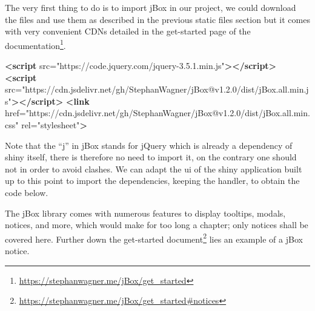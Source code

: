\documentclass[
]{krantz}
\makeatletter
\newenvironment{Shaded}{\begin{snugshade}}{\end{snugshade}}
\newcommand{\DataTypeTok}[1]{\textcolor[rgb]{0.27,0.27,0.27}{#1}}
\newcommand{\KeywordTok}[1]{\textcolor[rgb]{0.27,0.27,0.27}{\textbf{#1}}}
\newcommand{\NormalTok}[1]{#1}
\newcommand{\OperatorTok}[1]{\textcolor[rgb]{0.43,0.43,0.43}{\textbf{#1}}}
\newcommand{\OtherTok}[1]{\textcolor[rgb]{0.37,0.37,0.37}{#1}}
\newcommand{\StringTok}[1]{\textcolor[rgb]{0.5,0.5,0.5}{#1}}
\renewcommand{\href}[2]{#2\footnote{\url{#1}}}
\newenvironment{kframe}{%
\medskip{}
\setlength{\fboxsep}{.8em}
 \def\at@end@of@kframe{}%
 \ifinner\ifhmode%
  \def\at@end@of@kframe{\end{minipage}}%
  \begin{minipage}{\columnwidth}%
 \fi\fi%
 \def\FrameCommand##1{\hskip\@totalleftmargin \hskip-\fboxsep
 \colorbox{shadecolor}{##1}\hskip-\fboxsep
     \hskip-\linewidth \hskip-\@totalleftmargin \hskip\columnwidth}%
 \MakeFramed {\advance\hsize-\width
   \@totalleftmargin\z@ \linewidth\hsize
   \@setminipage}}%
 {\par\unskip\endMakeFramed%
 \at@end@of@kframe}
\renewenvironment{Shaded}{\begin{kframe}}{\end{kframe}}
\makeatother
\begin{document}
The very first thing to do is to import jBox in our project, we could download the files and use them as described in the previous static files section but it comes with very convenient CDNs detailed in the \href{https://stephanwagner.me/jBox/get_started}{get-started page of the documentation}.

\begin{Shaded}
\begin{Highlighting}[]
\KeywordTok{<script}\OtherTok{ src=}\StringTok{"https://code.jquery.com/jquery{-}3.5.1.min.js"}\KeywordTok{></script>}
\KeywordTok{<script}\OtherTok{ src=}\StringTok{"https://cdn.jsdelivr.net/gh/StephanWagner/jBox@v1.2.0/dist/jBox.all.min.js"}\KeywordTok{></script>}
\KeywordTok{<link}\OtherTok{ href=}\StringTok{"https://cdn.jsdelivr.net/gh/StephanWagner/jBox@v1.2.0/dist/jBox.all.min.css"}\OtherTok{ rel=}\StringTok{"stylesheet"}\KeywordTok{>}
\end{Highlighting}
\end{Shaded}

Note that the ``j'' in jBox stands for jQuery which is already a dependency of shiny itself, there is therefore no need to import it, on the contrary one should not in order to avoid clashes. We can adapt the ui of the shiny application built up to this point to import the dependencies, keeping the handler, to obtain the code below.

\begin{Shaded}
\end{Shaded}

The jBox library comes with numerous features to display tooltips, modals, notices, and more, which would make for too long a chapter; only notices shall be covered here. Further down the \href{https://stephanwagner.me/jBox/get_started\#notices}{get-started document} lies an example of a jBox notice.
\end{document}
